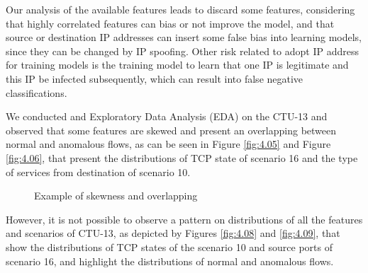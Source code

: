 Our analysis of the available features leads to discard some features, considering that highly correlated features can bias or not improve the model, and that source or destination IP addresses can insert some false bias into learning models, since they can be changed by IP spoofing. Other risk related to adopt IP address for training models is the training model to learn that
one IP is legitimate and this IP be infected subsequently, which can result into false negative classifications.

We conducted and Exploratory Data Analysis (EDA) on the CTU-13 and observed that some features are skewed and present an overlapping between normal and anomalous flows, as can be seen in Figure \ref{fig:4.05} and Figure \ref{fig:4.06}, that present the distributions of TCP state of scenario 16 and the type of services from destination of scenario 10.

\begin{figure}[!htb]
	\centering
	\caption[Skewness and Overlapping]{Example of skewness and overlapping}
	\label{fig:4.07}
\end{figure}

However, it is not possible to observe a pattern on distributions of all the features and scenarios of CTU-13, as depicted by Figures \ref{fig:4.08} and \ref{fig:4.09}, that show the distributions of TCP states of the scenario 10 and source ports of scenario 16, and highlight the distributions of normal and anomalous flows.

